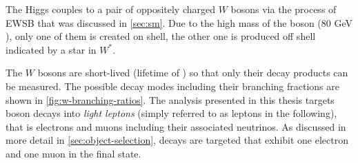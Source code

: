 
The Higgs couples to a pair of oppositely charged $W$ bosons via the process of EWSB that was discussed in \cref{sec:sm}. Due to the high mass of the \Wboson boson (80 GeV ), only one of them is created on shell, the other one is produced off shell indicated by a star in $W^*$.

The $W$ bosons are short-lived (lifetime of ) so that only their decay products can be measured. The possible decay modes including their branching fractions are shown in \cref{fig:w-branching-ratios}. The analysis presented in this thesis targets \Wboson boson decays into \emph{light leptons} (simply referred to as leptons in the following), that is electrons and muons including their associated neutrinos.
As discussed in more detail in \cref{sec:object-selection}, \HWW decays are targeted that exhibit one electron and one muon in the final state.

